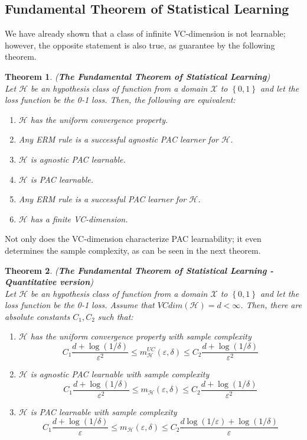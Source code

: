 \documentclass[12pt]{report}
\theoremstyle{plain}
\newtheorem{theorem}{Theorem}[chapter]
\newcommand\mcl[1]{\mathcal{#1}}
\begin{document}
\begin{flushleft}
\section{Fundamental Theorem of Statistical Learning}
We have already shown that a class of infinite VC-dimension is not learnable; 
however, the opposite statement is also true, as guarantee by the following 
theorem.
\begin{theorem} (\textbf{The Fundamental Theorem of Statistical Learning})\\
	Let $\mcl{H}$ be an hypothesis class of function from a domain $\mcl{X}$ to 
	$\left\{0,1\right\}$ and let the loss function be the 0-1 loss. Then, the 
	following are equivalent:
	\begin{enumerate}
		\item $\mcl{H}$ has the uniform convergence property.
		\item Any ERM rule is a successful agnostic PAC learner for $\mcl{H}$.
		\item $\mcl{H}$ is agnostic PAC learnable.
		\item $\mcl{H}$ is PAC learnable.
		\item Any ERM rule is a successful PAC learner for $\mcl{H}$.
		\item $\mcl{H}$ has a finite VC-dimension.
	\end{enumerate}
\label{th:fundamental_statistical_learning}
\end{theorem} 
Not only does the VC-dimension characterize PAC learnability; it even 
determines the sample complexity, as can be seen in the next theorem.
\begin{theorem} (\textbf{The Fundamental Theorem of Statistical Learning - 
Quantitative version})\\
	Let $\mcl{H}$ be an hypothesis class of function from a domain $\mcl{X}$ to 
	$\left\{0,1\right\}$ and let the loss function be the 0-1 loss. Assume that 
	$VCdim(\mcl{H})=d<\infty$. Then, there are absolute constants $C_1,C_2$ 
	such that:
	\begin{enumerate}
		\item $\mcl{H}$ has the uniform convergence property with sample 
		complexity
		\[ C_1\frac{d+\log(1/\delta)}{\varepsilon^2}\leq 
		m_{\mcl{H}}^{UC}(\varepsilon,\delta)\leq 
		C_2\frac{d+\log(1/\delta)}{\varepsilon^2} \]
		\item $\mcl{H}$ is agnostic PAC learnable with sample complexity 
		\[ C_1\frac{d+\log(1/\delta)}{\varepsilon^2}\leq 
		m_{\mcl{H}}(\varepsilon,\delta)\leq 
		C_2\frac{d+\log(1/\delta)}{\varepsilon^2} \]
		\item $\mcl{H}$ is PAC learnable with sample complexity
		\[ C_1\frac{d+\log(1/\delta)}{\varepsilon}\leq 
		m_{\mcl{H}}(\varepsilon,\delta)\leq 
		C_2\frac{d\log(1/\varepsilon)+\log(1/\delta)}{\varepsilon} \]
	\end{enumerate}
\end{theorem}



\end{flushleft}
\end{document}
